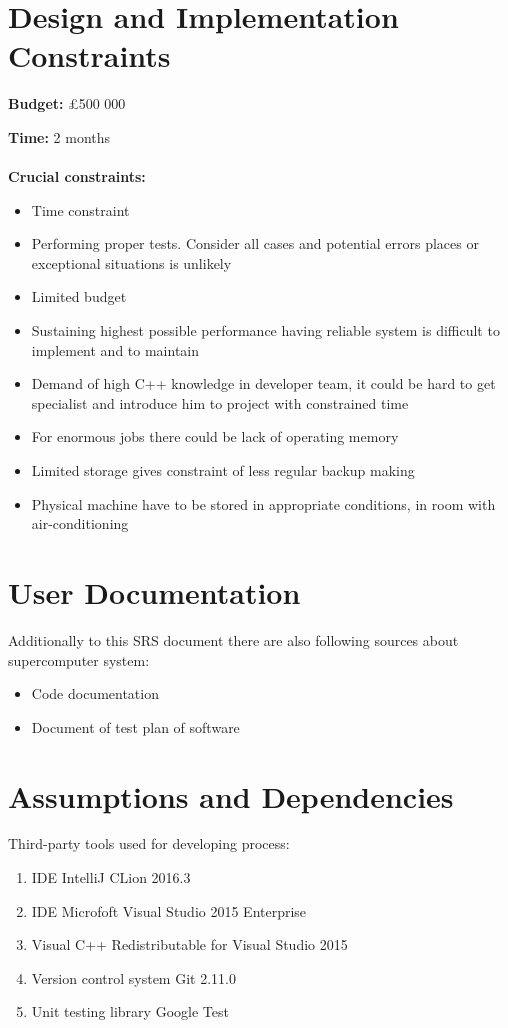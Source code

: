 \documentclass{scrreprt}
\begin{document}
\section{Design and Implementation Constraints}



\textbf{Budget:} \pounds 500 000

\textbf{Time:} 2 months
\\
\\
\textbf{Crucial constraints:}
\begin{itemize}
\item   Time constraint 
\item  Performing proper tests. Consider all cases and potential errors places or exceptional situations is unlikely
\item Limited budget
\item Sustaining highest possible performance having reliable system is difficult to implement and to maintain
\item Demand of high C++ knowledge in developer team, it could be hard to get specialist and introduce him to project with constrained time 
\item For enormous jobs there could be lack of operating memory
\item Limited storage gives constraint of less regular backup making
\item Physical machine have to be stored in appropriate conditions, in room with air-conditioning
\end{itemize}
 


\section{User Documentation}

Additionally to this SRS document there are also following sources about supercomputer system:
\begin{itemize}
\item  Code documentation
\item  Document of test plan of software
\end{itemize}


\section{Assumptions and Dependencies}


Third-party tools used for developing process:
\begin{enumerate}
\item  IDE IntelliJ CLion 2016.3
\item  IDE Microfoft Visual Studio 2015 Enterprise
\item  Visual C++ Redistributable for Visual Studio 2015 
\item  Version control system Git 2.11.0
\item  Unit testing library Google Test

\end{enumerate}
\end{document}

